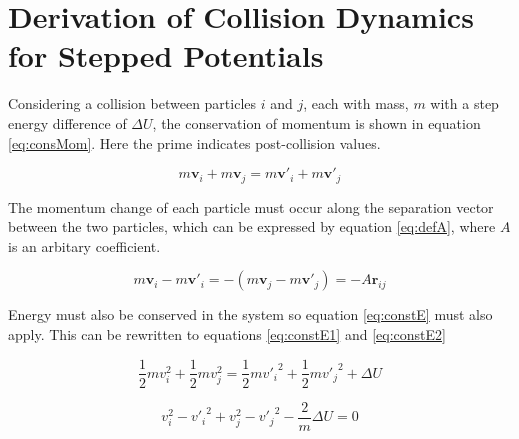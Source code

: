 \message{ !name(main.tex)}\documentclass[12pt]{UoAthesis}
\begin{document}
\newpage\printbibliography[heading=thesisChapterBib] 

\appendix
\chapter{Derivation of Collision Dynamics for Stepped Potentials}
Considering a collision between particles $i$ and $j$, each with mass,
$m$ with a step energy difference of $\Delta U$, the conservation of
momentum is shown in equation \eqref{eq:consMom}. Here the prime
indicates post-collision values.

\begin{equation}
\label{eq:consMom}
m\mathbf{v}_i + m\mathbf{v}_j = m\mathbf{v}'_i + m\mathbf{v}'_j
\end{equation}

The momentum change of each particle must occur along the separation
vector between the two particles, which can be expressed by equation
\eqref{eq:defA}, where $A$ is an arbitary coefficient.

\begin{equation}
  \label{eq:defA}
  m\mathbf{v}_i - m\mathbf{v}'_i = -(m\mathbf{v}_j - m\mathbf{v}'_j) 
  = -A\mathbf{\hat{r}}_{ij}
\end{equation}

Energy must also be conserved in the system so equation
\eqref{eq:constE} must also apply.  This can be rewritten to equations
\eqref{eq:constE1} and \eqref{eq:constE2}

\begin{equation}
  \label{eq:constE}
  \frac{1}{2}mv_i^2 + \frac{1}{2}mv_j^2 =
  \frac{1}{2}m{v'_i}^2 + \frac{1}{2}m{v'_j}^2 + \Delta U
\end{equation}

\begin{equation}
  \label{eq:constE1}
  v_i^2 - {v'_i}^2 +
  v_j^2 - {v'_j}^2 - \frac{2}{m}\Delta U = 0
\end{equation}
\end{document}
